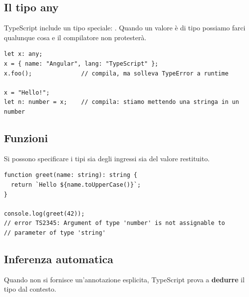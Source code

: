 \subsection{Il tipo any}

TypeScript include un tipo speciale: . Quando un valore è di tipo
 possiamo farci qualunque cosa e il compilatore non protesterà.

\begin{lstlisting}[style=ts]
let x: any;
x = { name: "Angular", lang: "TypeScript" };
x.foo();              // compila, ma solleva TypeError a runtime

x = "Hello!";
let n: number = x;    // compila: stiamo mettendo una stringa in un number
\end{lstlisting}


\subsection{Funzioni}

Si possono specificare i tipi sia degli ingressi sia del valore restituito.

\begin{lstlisting}[style=ts]
function greet(name: string): string {
  return `Hello ${name.toUpperCase()}`;
}

console.log(greet(42));
// error TS2345: Argument of type 'number' is not assignable to
// parameter of type 'string'
\end{lstlisting}

\subsection{Inferenza automatica}

Quando non si fornisce un'annotazione esplicita, TypeScript prova a
\textbf{dedurre} il tipo dal contesto.

